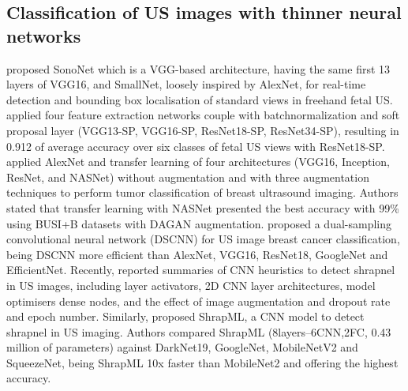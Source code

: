 \documentclass[mlabstract,twocolumn]{jmlr}
\begin{document}
\subsection{Classification of US images with thinner neural networks} \label{subsec:thinnerNets}
\citet{baumgartner2017-IEEETransMedImag} proposed SonoNet which is a VGG-based architecture, having the same first 13 layers of VGG16, and SmallNet, loosely inspired by AlexNet, for real-time detection and bounding box localisation of standard views in freehand fetal US.
\citet{toussaint2018-MICCAI} applied four feature extraction networks couple with batchnormalization and soft proposal layer (VGG13-SP, VGG16-SP, ResNet18-SP, ResNet34-SP), resulting in 0.912 of average accuracy over six classes of fetal US views with ResNet18-SP.
\citet{Al-Dhabyani2019-IJACSA} applied AlexNet and transfer learning of four architectures (VGG16, Inception, ResNet, and NASNet) without augmentation and with three augmentation techniques to perform tumor classification of breast ultrasound imaging.
Authors stated that transfer learning with NASNet presented the best accuracy with 99\% using BUSI+B datasets with DAGAN augmentation.
\citet{xie2020-physics-in-medicine-biology} proposed a dual-sampling convolutional neural network (DSCNN) for US image breast cancer classification, being DSCNN more efficient than AlexNet, VGG16, ResNet18, GoogleNet and EfficientNet.
Recently, \citet{snider2022-ScientificReports} reported summaries of CNN heuristics to detect shrapnel in US images, including layer activators, 2D CNN layer architectures, model optimisers dense nodes, and the effect of image augmentation and dropout rate and epoch number.
Similarly, \citet{boice2022-in-jimaging} proposed ShrapML, a CNN model to detect shrapnel in US imaging.
Authors compared ShrapML (8layers--6CNN,2FC, 0.43 million of parameters) against DarkNet19, GoogleNet, MobileNetV2 and SqueezeNet, being ShrapML 10x faster than MobileNet2 and offering the highest accuracy.
\end{document}
